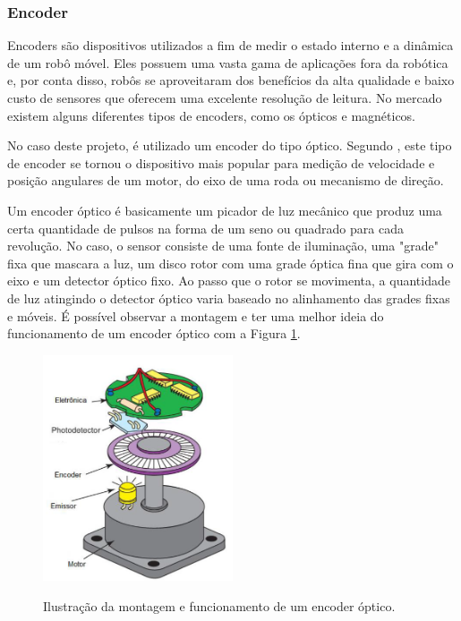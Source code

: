 \documentclass[acronym, symbols]{fei}
\begin{document}
			\subsubsection{Encoder}
				
				Encoders são dispositivos utilizados a fim de medir o estado interno e a dinâmica de um robô móvel. Eles possuem uma vasta gama de aplicações fora da robótica e, por conta disso, robôs se aproveitaram dos benefícios da alta qualidade e baixo custo de sensores que oferecem uma excelente resolução de leitura. No mercado existem alguns diferentes tipos de encoders, como os ópticos e magnéticos. 
				
				No caso deste projeto, é utilizado um encoder do tipo óptico. Segundo \textcite{siegwart2011introduction}, este tipo de encoder se tornou o dispositivo mais popular para medição de velocidade e posição angulares de um motor, do eixo de uma roda ou mecanismo de direção.
				
				Um encoder óptico é basicamente um picador de luz mecânico que produz uma certa quantidade de pulsos na forma de um seno ou quadrado para cada revolução. No caso, o sensor consiste de uma fonte de iluminação, uma "grade" fixa que mascara a luz, um disco rotor com uma grade óptica fina que gira com o eixo e um detector óptico fixo. Ao passo que o rotor se movimenta, a quantidade de luz atingindo o detector óptico varia baseado no alinhamento das grades fixas e móveis. É possível observar a montagem e ter uma melhor ideia do funcionamento de um encoder óptico com a Figura \ref{fig:optical_encoder}.
				
				\begin{figure}[!htb]
					\centering
					\caption{Ilustração da montagem e funcionamento de um encoder óptico.} 
					\includegraphics[width=0.5\textwidth]{encoder_optico.png}
					\label{fig:optical_encoder}
				\end{figure}
			
\end{document}
